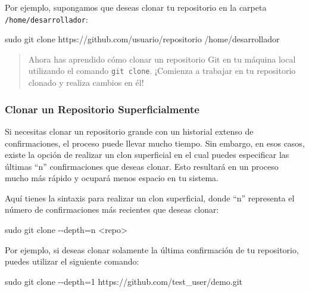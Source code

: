 \documentclass[
  a4paper,
]{article}
\newenvironment{Shaded}{}{}
\newcommand{\AttributeTok}[1]{\textcolor[rgb]{0.84,0.23,0.29}{#1}}
\newcommand{\FunctionTok}[1]{\textcolor[rgb]{0.44,0.26,0.76}{#1}}
\newcommand{\NormalTok}[1]{\textcolor[rgb]{0.14,0.16,0.18}{#1}}
\newcommand{\OperatorTok}[1]{\textcolor[rgb]{0.14,0.16,0.18}{#1}}
\begin{document}
Por ejemplo, supongamos que deseas clonar tu repositorio en la carpeta
\texttt{/home/desarrollador}:

\begin{Shaded}
\begin{Highlighting}[]
\FunctionTok{sudo}\NormalTok{ git clone https://github.com/usuario/repositorio /home/desarrollador}
\end{Highlighting}
\end{Shaded}

\begin{quote}
Ahora has aprendido cómo clonar un repositorio Git en tu máquina local
utilizando el comando \texttt{git\ clone}. ¡Comienza a trabajar en tu
repositorio clonado y realiza cambios en él!
\end{quote}

\subsubsection{Clonar un Repositorio
Superficialmente}\label{clonar-un-repositorio-superficialmente}

Si necesitas clonar un repositorio grande con un historial extenso de
confirmaciones, el proceso puede llevar mucho tiempo. Sin embargo, en
esos casos, existe la opción de realizar un clon superficial en el cual
puedes especificar las últimas ``n'' confirmaciones que deseas clonar.
Esto resultará en un proceso mucho más rápido y ocupará menos espacio en
tu sistema.

Aquí tienes la sintaxis para realizar un clon superficial, donde ``n''
representa el número de confirmaciones más recientes que deseas clonar:

\begin{Shaded}
\begin{Highlighting}[]
\FunctionTok{sudo}\NormalTok{ git clone }\AttributeTok{{-}{-}depth}\OperatorTok{=}\NormalTok{n }\OperatorTok{\textless{}}\NormalTok{repo}\OperatorTok{\textgreater{}}
\end{Highlighting}
\end{Shaded}

Por ejemplo, si deseas clonar solamente la última confirmación de tu
repositorio, puedes utilizar el siguiente comando:

\begin{Shaded}
\begin{Highlighting}[]
\FunctionTok{sudo}\NormalTok{ git clone }\AttributeTok{{-}{-}depth}\OperatorTok{=}\NormalTok{1 https://github.com/test\_user/demo.git}
\end{Highlighting}
\end{Shaded}
\end{document}
